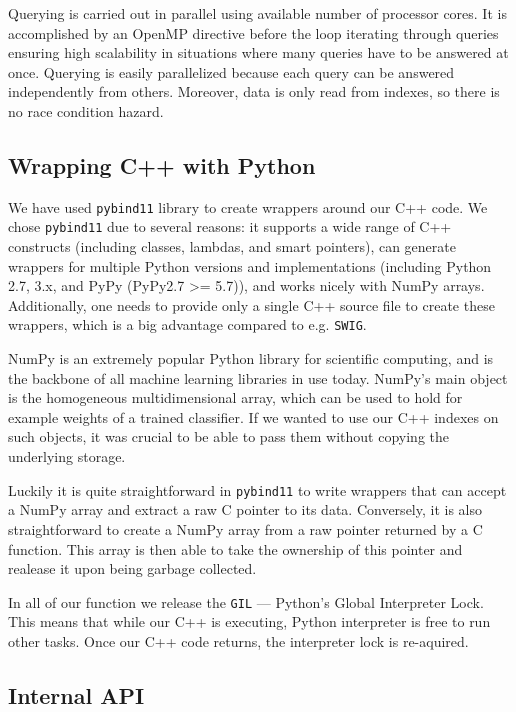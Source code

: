 Querying is carried out in parallel using available number of processor cores.
It is accomplished by an OpenMP directive
before the loop iterating through queries ensuring high scalability in situations
where many queries have to be answered at once.
Querying is easily parallelized because each query can be answered independently from others.
Moreover, data is only read from indexes, so there is no race condition hazard.

\subsection{Wrapping C++ with Python}

We have used \texttt{pybind11}\cite{pybind11} library to create wrappers around our C++ code. We chose \texttt{pybind11}
due to several reasons: it supports a wide range of C++ constructs
(including classes, lambdas, and smart pointers), can generate wrappers for multiple Python versions and
implementations (including Python 2.7, 3.x, and PyPy (PyPy2.7 >= 5.7)), and works nicely with NumPy arrays.
Additionally, one needs to provide only a single C++ source file to create these wrappers, which is
a big advantage compared to e.g. \texttt{SWIG}.

NumPy is an extremely popular Python library for scientific computing, and is the backbone of all
machine learning libraries in use today. NumPy’s main object is the homogeneous multidimensional array, which
can be used to hold for example weights of a trained classifier. If we wanted to use our C++ indexes on such
objects, it was crucial to be able to pass them without copying the underlying storage.

Luckily it is quite straightforward in \texttt{pybind11} to write wrappers that can accept a NumPy array
and extract a raw C pointer to its data. Conversely, it is also straightforward to create
a NumPy array from a raw pointer returned by a C function. This array is then able to take the
ownership of this pointer and realease it upon being garbage collected.

In all of our function we release the \texttt{GIL} --- Python's Global Interpreter Lock. This means that while our
C++ is executing, Python interpreter is free to run other tasks. Once our C++ code returns, the
interpreter lock is re-aquired.

\subsection{Internal API}

